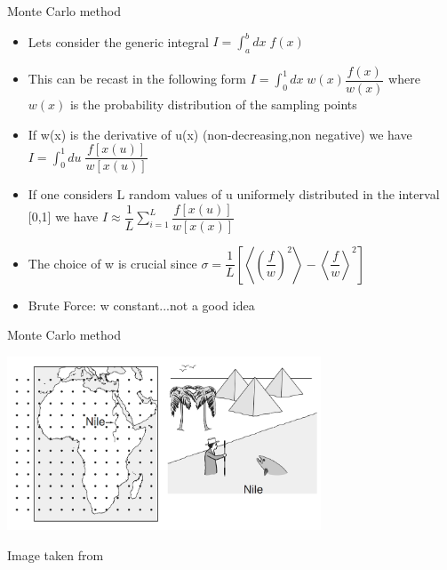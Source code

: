 \documentclass{beamer}
\begin{document}
\begin{frame}{Monte Carlo method \cite{frenkel2001understanding}}
\begin{itemize}
\item Lets consider the generic integral $I=\int^{b}_{a}dx\;f(x)$
\item This can be recast in the following form  $I=\int^{1}_{0}dx\;w(x)\dfrac{f(x)}{w(x)}$ where $w(x)$ is the probability distribution of the sampling points
\item If w(x) is the derivative of u(x) (non-decreasing,non negative) we have $I=\int^{1}_{0}du\;\dfrac{f[x(u)]}{w[x(u)]}$
\item If one considers L random values of u uniformely distributed in the interval [0,1] we have $I\approx\dfrac{1}{L}\sum_{i=1}^{L}\dfrac{f[x(u)]}{w[x(x)]}$
 \item The choice of w is crucial since $\sigma=\dfrac{1}{L}\left[\left\langle\left(\dfrac{f}{w}\right)^{2}\right\rangle-  \left\langle\dfrac{f}{w}\right\rangle^{2}\right]$
 \item Brute Force: w constant...not a good idea



\end{itemize}
\end{frame}


\begin{frame} {Monte Carlo method \cite{peliti2011statistical}}

 \begin{center}
     \includegraphics[width=0.7\textwidth]{Pic/Pic_river.png}
\end{center}
 \begin{center}
Image taken from \cite{frenkel2001understanding}
\end{center}
\end{frame}
\end{document}
